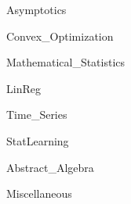 \documentclass{book}
\numberwithin{equation}{chapter}
\theoremstyle{definition}
\numberwithin{theorem}{section}
\theoremstyle{definition}
\theoremstyle{definition}
\theoremstyle{definition}
\theoremstyle{definition}
\theoremstyle{definition}
\theoremstyle{definition}
\begin{document}
{Asymptotics}

\pagebreak

{Convex_Optimization}

\pagebreak

{Mathematical_Statistics}

\pagebreak

{LinReg}

\pagebreak

{Time_Series}

\pagebreak


{StatLearning}

\pagebreak

{Abstract_Algebra}

\pagebreak

{Miscellaneous}



\end{document}
